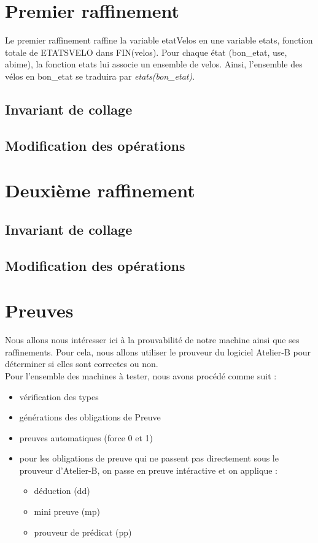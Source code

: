 \documentclass[12pt]{article}
\begin{document}
\section{Premier raffinement}
Le premier raffinement raffine la variable etatVelos en une variable etats, fonction totale de ETATSVELO dans FIN(velos). Pour chaque état (bon\_etat, use, abime), la fonction etats lui associe un ensemble de velos. Ainsi, l'ensemble des vélos en bon\_etat se traduira par \textit{etats(bon\_etat)}.
\subsection{Invariant de collage}
\subsection{Modification des opérations}
\newpage
\section{Deuxième raffinement}
\subsection{Invariant de collage}
\subsection{Modification des opérations}
\newpage
\section{Preuves}
Nous allons nous intéresser ici à la prouvabilité de notre machine ainsi que ses raffinements. Pour cela, nous allons utiliser le prouveur du logiciel Atelier-B pour déterminer si elles sont correctes ou non.\\

Pour l'ensemble des machines à tester, nous avons procédé comme suit :
\begin{itemize}
  \item vérification des types
  \item générations des obligations de Preuve
  \item preuves automatiques (force 0 et 1)
  \item pour les obligations de preuve qui ne passent pas directement sous le prouveur d'Atelier-B, on passe en preuve intéractive et on applique :
  \begin{itemize}
    \item déduction (dd)
    \item mini preuve (mp)
    \item prouveur de prédicat (pp)
  \end{itemize}
\end{itemize}
\end{document}
